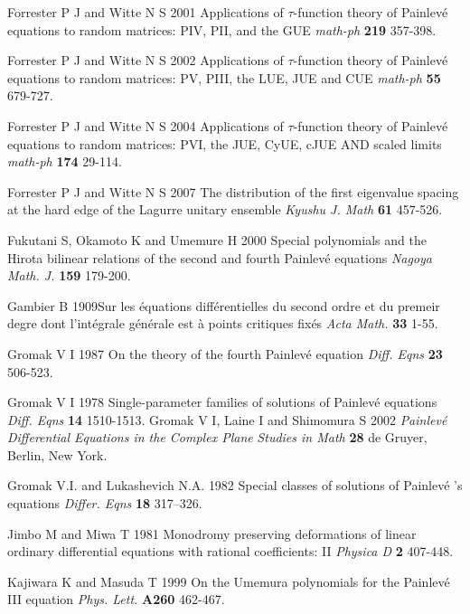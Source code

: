 \documentclass[12pt]{article}
\def\P{Painlev\'e }
\numberwithin{figure}{section}
\numberwithin{equation}{section}
\numberwithin{table}{section}
\begin{document}
\begin{thebibliography}{9}
  {Forrester P J and Witte N S} 2001 {Applications of $\tau$-function theory of Painlev\'e equations to random matrices: PIV, PII, and the GUE} {\it{math-ph}} {\bf{219}} 357-398.

  {Forrester P J and Witte N S} 2002 {Applications of $\tau$-function theory of Painlev\'e equations to random matrices: PV, PIII, the LUE, JUE
  and CUE} {\it{math-ph}} {\bf{55}} 679-727.

  {Forrester P J and Witte N S} 2004 {Applications of $\tau$-function theory of Painlev\'e equations to random matrices: PVI, the JUE, CyUE, cJUE AND scaled limits} {\it{math-ph}} {\bf{174}} 29-114.

  {Forrester P J and Witte N S} 2007 {The distribution of the first eigenvalue spacing at the hard edge of the Lagurre unitary ensemble} {\it{Kyushu J. Math}} {\bf{61}} 457-526.

  {Fukutani S, Okamoto K and Umemure H} 2000 Special polynomials and the Hirota
bilinear relations of the second and fourth \P equations  {\it{Nagoya Math.
J.}} {\bf{159}} 179-200.

  {Gambier B} {1909}{Sur les \'equations diff\'erentielles du second ordre et du premeir degre dont l'int\'egrale g\'en\'erale est \`a points critiques fix\'es} {\it{Acta Math.}} {\bf{33}} 1-55.

  {Gromak V I} 1987 {On the theory of the fourth \P equation} {\it{Diff. Eqns}} {\bf{23}} 506-523.

  {Gromak V I} 1978 Single-parameter families of solutions of \P equations  {\it{Diff. Eqns}}
  {\bf{14}} 1510-1513.
  {Gromak V I, Laine I and Shimomura S} 2002 {\it{Painlev\'e Differential Equations in the Complex Plane}} {\it{Studies in Math}}
  {\bf{28}} de Gruyer, Berlin, New York.

  {Gromak V.I. and Lukashevich N.A.} {1982} {Special classes of solutions of \P's equations} {\it{Differ. Eqns}} {\bf{18}} {317--326}.

  {Jimbo M and Miwa T} 1981 {Monodromy preserving deformations of linear ordinary differential equations with rational coefficients: II}
  {\it{Physica D}} {\bf{2}} 407-448.

  {Kajiwara K and Masuda T} 1999 {On the Umemura polynomials for the \P
III equation} {\it{Phys. Lett.}} {\bf{A260}} 462-467.


\end{thebibliography}
\end{document}
